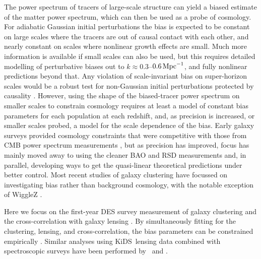 \documentclass[longauth,traditabstract]{aa}
\def\,{\thinspace}
\newcommand{\KIDS}{{KiDS}}
\providecommand{\text}[1]{\rm{#1}}
\newcommand{\Mpc}{\text{Mpc}}
\begin{document}
The power spectrum of tracers of large-scale structure can yield a biased estimate of the matter power spectrum, which can then be used as a probe of cosmology.
For adiabatic Gaussian initial perturbations the bias is expected to be constant on large scales where the tracers are out of causal contact with each other, and nearly constant on scales where nonlinear growth effects are small.
Much more information is available if small scales can also be used, but this requires detailed modelling of perturbative biases out to $k\approx 0.3$--$0.6\,\Mpc^{-1}$, and fully nonlinear predictions beyond that. Any violation of scale-invariant bias on super-horizon scales would be a robust test for non-Gaussian initial perturbations protected by causality \citep{Dalal:2007cu}. However, using the shape of the biased-tracer power spectrum on smaller scales to constrain cosmology requires at least a model of constant bias parameters for each population at each redshift, and, as precision is increased, or smaller scales probed, a model for the scale dependence of the bias.
Early galaxy surveys provided cosmology constraints that were competitive with those from CMB power spectrum measurements \citep[e.g.,][]{Percival:2001hw}, but as precision has improved, focus has mainly moved away to using the cleaner BAO and RSD measurements and, in parallel, developing ways to get the quasi-linear theoretical predictions under better control. Most recent studies of galaxy clustering have focussed on investigating bias rather than background cosmology, with the notable exception of WiggleZ \citep{Parkinson:2012vd}.

Here we focus on the first-year DES survey measurement of galaxy clustering \citep{Elvin-Poole:2017xsf} and the cross-correlation with galaxy lensing \citep[``galaxy-galaxy lensing'']{Prat:2017goa}.  By simultaneously fitting for the clustering, lensing, and cross-correlation, the bias parameters can be constrained empirically \citep{Abbott:2017wau}. Similar analyses using \KIDS\
lensing data combined with spectroscopic surveys have been performed by~\citet{vanUitert:2017ieu} and \citet{Joudaki:2018}.
\end{document}
